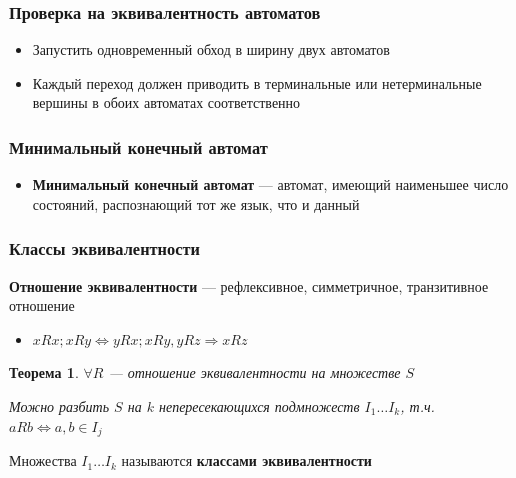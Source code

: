 \documentclass{beamer}
\newtheorem{rutheorem}{Теорема}
\begin{document}
\begin{frame}[fragile]
  \transwipe[direction=90]
  \frametitle{Проверка на эквивалентность автоматов}
  \begin{itemize}
    \item Запустить одновременный обход в ширину двух автоматов
    \item Каждый переход должен приводить в терминальные или нетерминальные вершины в обоих автоматах соответственно
  \end{itemize}
\end{frame}

\begin{frame}[fragile]
  \transwipe[direction=90]
  \frametitle{Минимальный конечный автомат}
  \begin{itemize}
    \item \textbf{Минимальный конечный автомат} --- автомат, имеющий наименьшее число состояний, распознающий тот же язык, что и данный
  \end{itemize}
\end{frame}

\begin{frame}[fragile]
  \transwipe[direction=90]
  \frametitle{Классы эквивалентности}
    \textbf{Отношение эквивалентности} --- рефлексивное, симметричное, транзитивное отношение
    \begin{itemize}
      \item $xRx; xRy \Leftrightarrow yRx; xRy, yRz \Rightarrow xRz$
    \end{itemize}
    
    \begin{rutheorem}
       $\forall R$ --- отношение эквивалентности на множестве $S$
      
      Можно разбить $S$ на $k$ непересекающихся подмножеств $I_1 \dots I_k$, т.ч. $aRb \Leftrightarrow a, b \in I_j$
    \end{rutheorem}
    
    Множества $I_1 \dots I_k$ называются \textbf{классами эквивалентности}
\end{frame}
\end{document}
